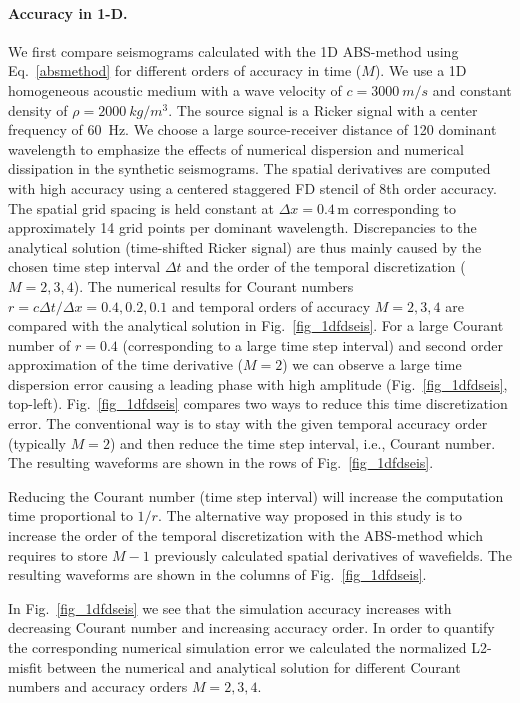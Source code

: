 \paragraph{Accuracy in 1-D.}
We first compare seismograms calculated with the 1D ABS-method using Eq.~\ref{absmethod} for different orders of accuracy in time ($M$). We use a 1D homogeneous acoustic  medium with a wave velocity of $c=\SI{3000}{m/s}$ and constant density of $\rho=\SI{2000}{kg/m^3}$. The source signal is a Ricker signal with a center frequency of \SI{60}{Hz}. We choose a large source-receiver distance of 120 dominant wavelength to emphasize the effects of numerical dispersion and numerical dissipation in the synthetic seismograms. The spatial derivatives are computed with high accuracy using a centered staggered FD stencil of 8th order accuracy.  The spatial grid spacing is held constant at $\Delta x=0.4$\,m corresponding to approximately 14 grid points per dominant wavelength. Discrepancies to the analytical solution (time-shifted Ricker signal) are thus mainly caused by the chosen time step interval $\Delta t$ and the order of the temporal discretization ($M=2,3,4$). The numerical results for Courant numbers $r=c \Delta t/\Delta x=0.4, 0.2, 0.1$ and temporal orders of accuracy $M=2, 3, 4$ are compared with the analytical solution in Fig.~\ref{fig_1dfdseis}. For a large Courant number of $r=0.4$ (corresponding to a large time step interval) and second order approximation of the time derivative ($M=2$) we can observe a large time dispersion error causing a leading phase with high amplitude (Fig.~\ref{fig_1dfdseis}, top-left). Fig.~\ref{fig_1dfdseis} compares two ways to reduce this time discretization error. The conventional way is to  stay with the given temporal accuracy order (typically $M=2$) and then reduce the time step interval, i.e., Courant number. The resulting waveforms are shown in the rows of Fig.~\ref{fig_1dfdseis}.

Reducing the Courant number (time step interval) will increase the computation time proportional to $1/r$.  The alternative  way proposed in this study is to increase the order of the temporal discretization with the ABS-method which requires to store $M-1$ previously calculated spatial derivatives of wavefields. The resulting waveforms are shown in the columns of Fig.~\ref{fig_1dfdseis}.

In Fig.~\ref{fig_1dfdseis} we see that the simulation accuracy increases with decreasing Courant number and increasing accuracy order. In order to quantify the corresponding numerical simulation error we calculated the normalized L2-misfit between the numerical and analytical solution for different Courant numbers and accuracy orders $M=2,3,4$. 

